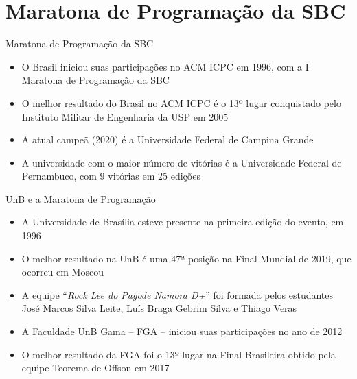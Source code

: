 \section{Maratona de Programação da SBC}

\begin{frame}[fragile]{Maratona de Programação da SBC}

    \begin{itemize}
        \item O Brasil iniciou suas participações no ACM ICPC em 1996, com a I Maratona de
            Programação da SBC
        \item O melhor resultado do Brasil no ACM ICPC é o 13º lugar conquistado pelo 
            Instituto Militar de Engenharia da USP em 2005
        \item A atual campeã (2020) é a Universidade Federal de Campina Grande
        \item A universidade com o maior número de vitórias é a Universidade Federal de
            Pernambuco, com 9 vitórias em 25 edições
    \end{itemize}

\end{frame}

\begin{frame}[fragile]{UnB e a Maratona de Programação}

    \begin{itemize}
        \item A Universidade de Brasília esteve presente na primeira edição do evento, em 1996
        \item O melhor resultado na UnB é uma 47ª posição na Final Mundial de 2019, que ocorreu
            em Moscou

        \item A equipe ``\textit{Rock Lee do Pagode Namora D+}'' foi formada pelos estudantes José Marcos 
            Silva Leite, Luís Braga Gebrim Silva e Thiago Veras

        \item A Faculdade UnB Gama -- FGA -- iniciou suas participações no ano de 2012
        \item O melhor resultado da FGA foi o 13º lugar na Final Brasileira obtido pela equipe 
            Teorema de Offson em 2017
    \end{itemize}

\end{frame}

